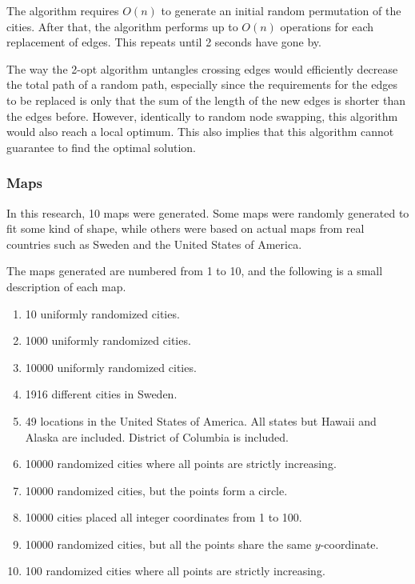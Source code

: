 \documentclass{article}
\begin{document}
\noindent
The algorithm requires $O(n)$ to generate an initial random permutation of the cities. After that, the algorithm performs up to $O(n)$ operations for each replacement of edges. This repeats until 2 seconds have gone by.

\noindent
The way the 2-opt algorithm untangles crossing edges would efficiently decrease the total path of a random path, especially since the requirements for the edges to be replaced is only that the sum of the length of the new edges is shorter than the edges before. However, identically to random node swapping, this algorithm would also reach a local optimum. This also implies that this algorithm cannot guarantee to find the optimal solution.


\subsubsection{Maps}\label{maps}
In this research, 10 maps were generated. Some maps were randomly generated to fit some kind of shape, while others were based on actual maps from real countries such as Sweden and the United States of America.

\noindent
The maps generated are numbered from 1 to 10, and the following is a small description of each map.

\begin{enumerate}
  \item 10 uniformly randomized cities.
  \item 1000 uniformly randomized cities.
  \item 10000 uniformly randomized cities.
  \item 1916 different cities in Sweden.
  \item 49 locations in the United States of America. All states but Hawaii and Alaska are included. District of Columbia is included.
  \item 10000 randomized cities where all points are strictly increasing. 
  \item 10000 randomized cities, but the points form a circle.
  \item 10000 cities placed all integer coordinates from 1 to 100.
  \item 10000 randomized cities, but all the points share the same $y$-coordinate.
  \item 100 randomized cities where all points are strictly increasing.
\end{enumerate}
\end{document}
